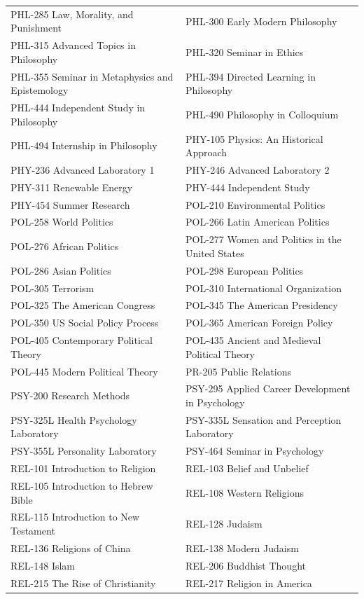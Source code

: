 \documentclass[
  letterpaper,
]{scrbook}
\begin{document}
{\begin{longtable}[]{@{}
  >{\raggedright\arraybackslash}p{}
  >{\raggedright\arraybackslash}p{}@{}}
PHL-285 Law, Morality, and Punishment & PHL-300 Early Modern
Philosophy \\
PHL-315 Advanced Topics in Philosophy & PHL-320 Seminar in Ethics \\
PHL-355 Seminar in Metaphysics and Epistemology & PHL-394 Directed
Learning in Philosophy \\
PHL-444 Independent Study in Philosophy & PHL-490 Philosophy in
Colloquium \\
PHL-494 Internship in Philosophy & PHY-105 Physics: An Historical
Approach \\
PHY-236 Advanced Laboratory 1 & PHY-246 Advanced Laboratory 2 \\
PHY-311 Renewable Energy & PHY-444 Independent Study \\
PHY-454 Summer Research & POL-210 Environmental Politics \\
POL-258 World Politics & POL-266 Latin American Politics \\
POL-276 African Politics & POL-277 Women and Politics in the United
States \\
POL-286 Asian Politics & POL-298 European Politics \\
POL-305 Terrorism & POL-310 International Organization \\
POL-325 The American Congress & POL-345 The American Presidency \\
POL-350 US Social Policy Process & POL-365 American Foreign Policy \\
POL-405 Contemporary Political Theory & POL-435 Ancient and Medieval
Political Theory \\
POL-445 Modern Political Theory & PR-205 Public Relations \\
PSY-200 Research Methods & PSY-295 Applied Career Development in
Psychology \\
PSY-325L Health Psychology Laboratory & PSY-335L Sensation and
Perception Laboratory \\
PSY-355L Personality Laboratory & PSY-464 Seminar in Psychology \\
REL-101 Introduction to Religion & REL-103 Belief and Unbelief \\
REL-105 Introduction to Hebrew Bible & REL-108 Western Religions \\
REL-115 Introduction to New Testament & REL-128 Judaism \\
REL-136 Religions of China & REL-138 Modern Judaism \\
REL-148 Islam & REL-206 Buddhist Thought \\
REL-215 The Rise of Christianity & REL-217 Religion in America \\

\end{longtable}}
\end{document}
